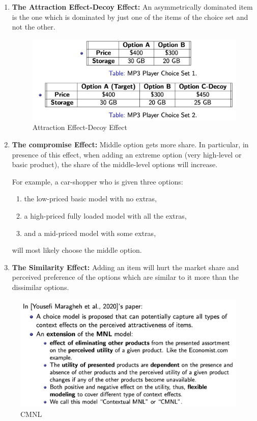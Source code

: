 \documentclass[11pt]{elegantbook}
\begin{document}
\begin{enumerate}[$\bullet$]
    \item \textbf{The Attraction Effect-Decoy Effect:} An asymmetrically dominated item is the one which is dominated by just
    one of the items of the choice set and not the other.
    \begin{center}\begin{figure}[htbp]
        \centering
        \includegraphics[scale=0.3]{CMNL1.png}
        \caption{Attraction Effect-Decoy Effect}
        \label{}
    \end{figure}\end{center}
    \item \textbf{The compromise Effect:} Middle option gets more share. In particular, in presence of this effect, when adding an extreme option (very high-level or basic product), the share of the middle-level options will increase.
    
    For example, a car-shopper who is given three options:
    \begin{enumerate}[1.]
        \item the low-priced basic model with no extras,
        \item a high-priced fully loaded model with all the extras,
        \item and a mid-priced model with some extras,
    \end{enumerate}
    will most likely choose the middle option.
    \item \textbf{The Similarity Effect:} Adding an item will hurt the market share and perceived preference of the options which are similar to it more than the dissimilar options.
\end{enumerate}
\begin{center}\begin{figure}[htbp]
    \centering
    \includegraphics[scale=0.5]{CMNL2.png}
    \caption{CMNL}
    \label{}
\end{figure}\end{center}
\end{document}
